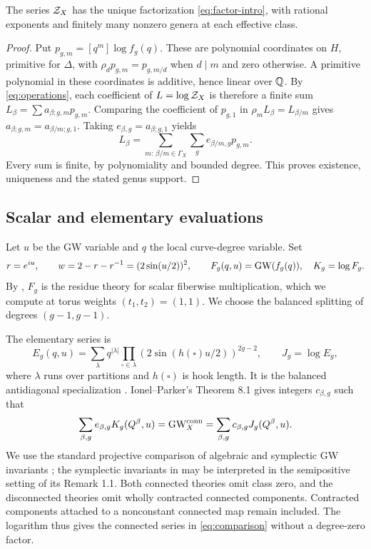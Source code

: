 \begin{lemma}\label{lem:factor}
The series $\mathcal Z_X$ has the unique factorization
\eqref{eq:factor-intro}, with rational exponents and finitely many
nonzero genera at each effective class.
\end{lemma}
\begin{proof}
Put $p_{g,m}=[q^m]\log f_g(q)$. These are polynomial coordinates
on $H$, primitive for $\Delta$, with
$\rho_dp_{g,m}=p_{g,m/d}$ when $d\mid m$ and zero otherwise.
A primitive polynomial in these coordinates is additive, hence linear
over $\mathbb Q$. By \eqref{eq:operations}, each coefficient of
$L=\log\mathcal Z_X$ is therefore a finite sum
$L_\beta=\sum a_{\beta;g,m}p_{g,m}$. Comparing the coefficient of
$p_{g,1}$ in $\rho_mL_\beta=L_{\beta/m}$ gives
$a_{\beta;g,m}=a_{\beta/m;g,1}$. Taking
$e_{\beta,g}=a_{\beta;g,1}$ yields
\[
 L_\beta=\sum_{m:\,\beta/m\in\Gamma_X}\sum_g
 e_{\beta/m,g}p_{g,m}.
\]
Every sum is finite, by polynomiality and bounded degree. This proves
existence, uniqueness and the stated genus support.
\end{proof}

\subsection{Scalar and elementary evaluations}
Let $u$ be the GW variable and $q$ the local curve-degree variable.
Set
\begin{equation}\label{eq:variables}
 r=e^{iu},\qquad w=2-r-r^{-1}=(2\sin(u/2))^2,
 \qquad F_g(q,u)=\operatorname{GW}(f_g(q)),\quad K_g=\log F_g.
\end{equation}
By \cite[Section 4.2 and Proposition 4.8]{Pardon}, $F_g$ is the
residue theory for scalar fiberwise multiplication, which we compute
at torus weights $(t_1,t_2)=(1,1)$. We choose the balanced splitting
of degrees $(g-1,g-1)$.

The elementary series is
\begin{equation}\label{eq:hooks}
 E_g(q,u)=\sum_\lambda q^{|\lambda|}
 \prod_{\square\in\lambda}
       (2\sin(h(\square)u/2))^{2g-2},\qquad J_g=\log E_g,
\end{equation}
where $\lambda$ runs over partitions and $h(\square)$ is hook length.
It is the balanced antidiagonal specialization
\cite[Proposition 3.3]{IP}. Ionel--Parker's Theorem 8.1 gives integers
$c_{\beta,g}$ such that
\begin{equation}\label{eq:comparison}
 \sum_{\beta,g}e_{\beta,g}K_g(Q^\beta,u)
 =\operatorname{GW}_X^{\mathrm{conn}}
 =\sum_{\beta,g}c_{\beta,g}J_g(Q^\beta,u).
\end{equation}
We use the standard projective comparison of algebraic and symplectic
GW invariants \cite[Theorem 0.1]{Siebert}; the symplectic invariants
in \cite{IP} may be interpreted in the semipositive setting of its
Remark 1.1. Both connected theories omit class zero, and the
disconnected theories omit wholly contracted connected components.
Contracted components attached to a nonconstant connected map remain
included. The logarithm thus gives the connected series in
\eqref{eq:comparison} without a degree-zero factor.

